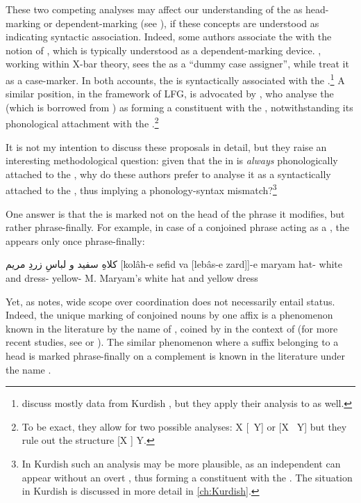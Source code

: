 These two competing analyses may affect our understanding of the \ez* as head-marking or dependent-marking (see ), if these concepts are understood as indicating syntactic association. Indeed, some authors  associate the \ez* with the notion of , which is typically understood as a dependent-marking device. \citet{Samiian1994}, working within X-bar theory, sees the \ez* as a \enquote{dummy case assigner}, while \citet{LarsonYamakido} treat it as a \gen* case-marker. In both accounts, the \ez* is syntactically associated with the \secn.\footnote{\citet{LarsonYamakido} discuss mostly data from Kurdish , but they apply their analysis to  as well.} A similar position, in the framework of LFG, is advocated by \citet{BögelButt, BögelButtSulger}, who analyse the  \ez* (which is borrowed from ) as forming a constituent with the \secn, notwithstanding its phonological attachment with the \prim.\footnote{To be exact, they allow for two possible analyses: X [\ez\ Y] or [X \ez\ Y] but they rule out the structure [X \ez] Y.}

It is not my intention to discuss these proposals in detail, but they raise an interesting methodological question: given that the \ez* in  is \textit{always} phonologically attached to the \prim, why do these authors prefer to analyse it as a  syntactically attached to the \secn, thus implying a phonology-syntax mismatch?\footnote{In \Kur Kurdish such an analysis may be more plausible, as an independent \ez* can appear without an overt \prim, thus forming a constituent with the \secn. The situation in Kurdish is discussed in more detail in \ref{ch:Kurdish}.}

One answer is that the \ez* is marked not on the head of the phrase it modifies, but rather phrase-finally. For example, in case of a conjoined phrase acting as a \prim, the \ez* appears only once phrase-finally:

{کلاهِ سفید و لباسِ  زردِ مریم}
{[kolâh-e sefid va [lebâs-e zard]]-e maryam}
{hat-\ez{} white and dress-\ez{} yellow-\ez{} M.}
{Maryam’s white hat and yellow dress}
{\citep[630]{SamvelianEzafe}}

Yet, as \citet[624]{SamvelianEzafe} notes, wide scope over coordination does not necessarily entail  status. Indeed, the unique marking of conjoined nouns by one affix is a phenomenon known in the literature by the name of , coined by \citet{LewisGrammar} in the context of  (for more recent studies, see \cite{KabakSuspended} or \cite{BroadwellSuspended}). The similar phenomenon where a suffix belonging to a head is marked phrase-finally on a complement is known in the literature under the name  \citep[50]{PlankIntro}.


